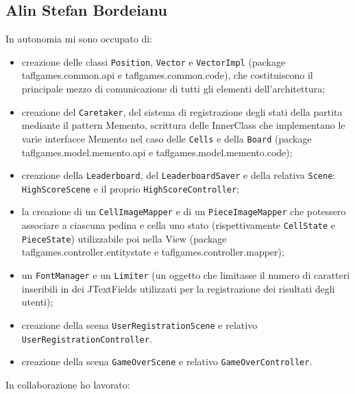 \documentclass[a4paper,12pt]{report}
\begin{document}
\subsection{Alin Stefan Bordeianu}
In autonomia mi sono occupato di:
\begin{itemize}
	\item creazione delle classi \texttt{Position}, \texttt{Vector} e \texttt{VectorImpl} (package taflgames.common.api e taflgames.common.code), che costituiscono il principale mezzo di comunicazione di tutti gli elementi dell'architettura;
	
	\item creazione del \texttt{Caretaker}, del sistema di registrazione degli stati della partita mediante il pattern Memento, scrittura delle InnerClass che implementano le varie interfacce Memento nel caso delle \texttt{Cells} e della \texttt{Board} (package taflgames.model.memento.api e taflgames.model.memento.code);
	
	\item creazione della \texttt{Leaderboard}, del \texttt{LeaderboardSaver} e della relativa \texttt{Scene}: \texttt{HighScoreScene} e il proprio \texttt{HighScoreController};
	
	\item la creazione di un \texttt{CellImageMapper} e di un \texttt{PieceImageMapper} che potessero associare a ciascuna pedina e cella uno stato (rispettivamente \texttt{CellState} e \texttt{PieceState}) utilizzabile poi nella View (package taflgames.controller.entitystate e taflgames.controller.mapper);
	
	\item un \texttt{FontManager} e un \texttt{Limiter} (un oggetto che limitasse il numero di caratteri inseribili in dei JTextFields utilizzati per la registrazione dei risultati degli utenti);
	
	\item creazione della scena \texttt{UserRegistrationScene} e relativo \texttt{UserRegistrationController}.
	
	\item creazione della scena \texttt{GameOverScene} e relativo \texttt{GameOverController}.
\end{itemize}
In collaborazione ho lavorato:
\end{document}
